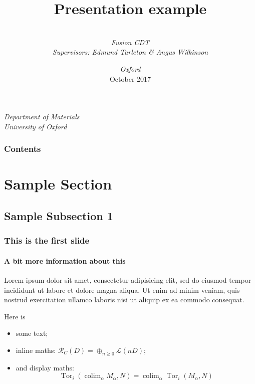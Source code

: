 


\title[Presentation]
	{%
		Presentation example
	} %
\author%
	{%
		\\
		\textit{Fusion CDT}\\
		\textit{Supervisors: Edmund Tarleton \& Angus Wilkinson}\\
	}
\institute%
	{%
		\textit{Department of Materials}\\
		\textit{University of Oxford}
	}
\date[DCG]%
	{%
		\textit{Oxford}\\
		October 2017
	}


\begin{frame}[plain]
	\titlepage
\end{frame}
%
\begin{frame}
	\frametitle{Contents}
	\framesubtitle{\inserttitle}
	\tableofcontents
\end{frame}
%
\section{Sample Section}
\subsection{Sample Subsection 1}
\begin{frame}
	\frametitle{This is the first slide}
	\framesubtitle{A bit more information about this}

	Lorem ipsum dolor sit amet, consectetur adipisicing elit, sed do eiusmod
	tempor incididunt ut labore et dolore magna aliqua. Ut enim ad minim veniam,
	quis nostrud exercitation ullamco laboris nisi ut aliquip ex ea commodo
	consequat.

	Here is
	\the\paperwidth
	\begin{itemize}
		\item some text;
		\item inline maths: $\mathcal{R}_C(D)=\oplus_{n\geqslant0}\mathcal{L}(nD)$;
		\item and display maths:
		      \[
			      \operatorname{Tor}_i(\operatorname{colim}_\alpha M_\alpha, N)
			      = \operatorname{colim}_\alpha\operatorname{Tor}_i(M_\alpha,N)
		      \]
	\end{itemize}

\end{frame}

